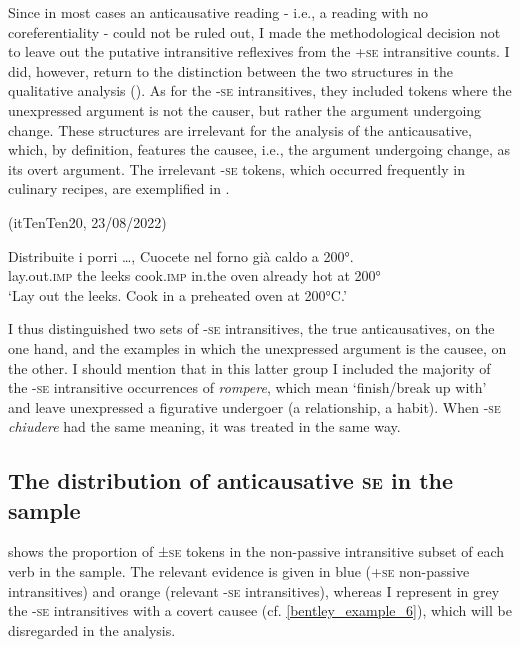 \documentclass[output=paper,colorlinks,citecolor=brown
]{langscibook}
\begin{document}
Since in most cases an anticausative reading - i.e., a reading with no coreferentiality - could not be ruled out, I made the methodological decision not to leave out the putative intransitive reflexives from the +\textsc{se} intransitive counts. I did, however, return to the distinction between the two structures in the qualitative analysis ().
As for the -\textsc{se} intransitives, they included tokens where the unexpressed argument is not the causer, but rather the argument undergoing change. These structures are irrelevant for the analysis of the anticausative, which, by definition, features the causee, i.e., the argument undergoing change, as its overt argument. The irrelevant -\textsc{se} tokens, which occurred frequently in culinary recipes, are exemplified in .


\hspace*{\fill}(itTenTen20, 23/08/2022)\quad

\ea \label{bentley_example_6}
\gll Distribuite i porri  \ldots , Cuocete nel forno già caldo a 200°. \\
    lay.out.\textsc{imp}	the	leeks {} cook.\textsc{imp} in.the oven already hot at 200° \\
\glt ‘Lay out the leeks. Cook in a preheated oven at 200°C.’ 
\z

I thus distinguished two sets of -\textsc{se} intransitives, the true anticausatives, on the one hand, and the examples in which the unexpressed argument is the causee, on the other. I should mention that in this latter group I included the majority of the -\textsc{se} intransitive occurrences of \textit{rompere}, which mean ‘finish/break up with’ and leave unexpressed a figurative undergoer (a relationship, a habit). When -\textsc{se} \textit{chiudere} had the same meaning, it was treated in the same way. 

\subsection{The distribution of anticausative \textsc{se} in the sample}
\label{bentley_section_3.2}
 shows the proportion of ±\textsc{se} tokens in the non-passive intransitive subset of each verb in the sample. The relevant evidence is given in blue (+\textsc{se} non-passive intransitives) and orange (relevant -\textsc{se} intransitives), whereas I represent in grey the -\textsc{se} intransitives with a covert causee (cf. \ref{bentley_example_6}), which will be disregarded in the analysis.
\end{document}

